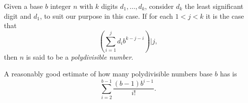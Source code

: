 \documentclass[12pt]{article}
\begin{document}
Given a base $b$ integer $n$ with $k$ digits $d_1, \ldots, d_k$, consider $d_k$ the least significant digit and $d_1$, to suit our purpose in this case. If for each $1 < j < k$ it is the case that $$(\sum_{i = 1}^j d_ib^{k - j - i}) | j,$$ then $n$ is said to be a {\em polydivisible number}.

A reasonably good estimate of how many polydivisible numbers base $b$ has is $$\sum_{i = 2}^{b - 1} \frac{(b - 1)b^{i - 1}}{i!}.$$ 
\end{document}
